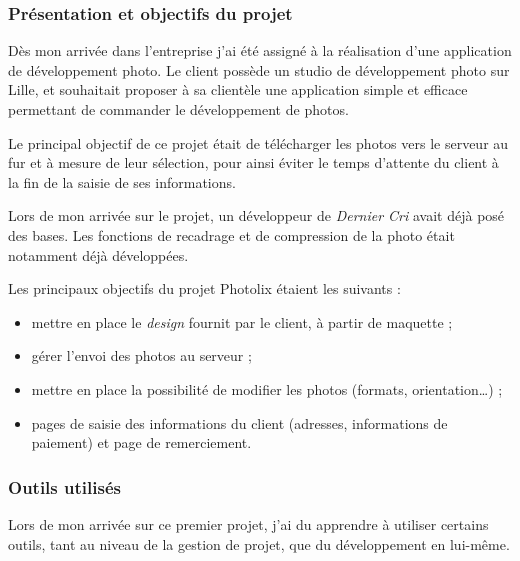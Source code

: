 \subsubsection{Présentation et objectifs du
projet}\label{pruxe9sentation-et-objectifs-du-projet}

\bigskip

Dès mon arrivée dans l'entreprise j'ai été assigné à la réalisation
d'une application de développement photo. Le client possède un studio de
développement photo sur Lille, et souhaitait proposer à sa clientèle une
application simple et efficace permettant de commander le développement
de photos.

\bigskip

Le principal objectif de ce projet était de télécharger les photos vers
le serveur au fur et à mesure de leur sélection, pour ainsi éviter le
temps d'attente du client à la fin de la saisie de ses informations.

\bigskip

Lors de mon arrivée sur le projet, un développeur de \emph{Dernier Cri}
avait déjà posé des bases. Les fonctions de recadrage et de compression
de la photo était notamment déjà développées.

\bigskip

Les principaux objectifs du projet Photolix étaient les suivants :

\begin{itemize}
\tightlist
\item
  mettre en place le \emph{design} fournit par le client, à partir de
  maquette ;
\item
  gérer l'envoi des photos au serveur ;
\item
  mettre en place la possibilité de modifier les photos (formats,
  orientation\ldots{}) ;
\item
  pages de saisie des informations du client (adresses, informations de
  paiement) et page de remerciement.
\end{itemize}

\bigskip

\subsubsection{Outils utilisés}\label{outils-utilisuxe9s}

\bigskip

Lors de mon arrivée sur ce premier projet, j'ai du apprendre à utiliser
certains outils, tant au niveau de la gestion de projet, que du
développement en lui-même.

